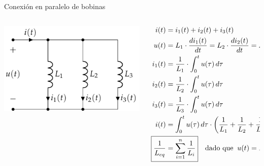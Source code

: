 \documentclass[aspectratio=169, xcolor={usenames,svgnames,dvipsnames}]{beamer}
\begin{document}
\begin{frame}{Conexión en paralelo de bobinas}
    \begin{columns}
    \begin{column}{0.4\columnwidth}
        \vspace{-10mm}
        \begin{center}
        \includegraphics[width=1\linewidth]{../figs/BobinasParalelo.pdf}
        \end{center}
    \end{column}
    \begin{column}{0.6\columnwidth}
    \begin{align*}
      i(t)& = i_1(t) + i_2(t) + i_3(t)\\
      u(t) &= L_1 \cdot \frac{di_1(t)}{dt}= L_2 \cdot \frac{di_2(t)}{dt}= L_3 \cdot \frac{di_3(t)}{dt}\\
      i_1(t)&=\dfrac{1}{L_1}\cdot\int_{0}^{t} u(\tau)\, d\tau\\
      i_2(t)&=\dfrac{1}{L_2}\cdot\int_{0}^{t} u(\tau)\, d\tau\\
      i_3(t)&=\dfrac{1}{L_3}\cdot\int_{0}^{t} u(\tau)\, d\tau\\
      i(t)& = \int_{0}^{t} u(\tau)\,d\tau \cdot \left(\dfrac{1}{L_1}+\dfrac{1}{L_2}+\dfrac{1}{L_3}\right)\\
      \Aboxed{\frac{1}{L_{eq}} &= \sum_{i = 1}^n \frac{1}{L_i}} \quad \textrm{dado que} \;\; u(t) = L_{eq} \cdot \frac{di(t)}{dt}
    \end{align*}
    \end{column}
    \end{columns}
\end{frame}

\end{document}
